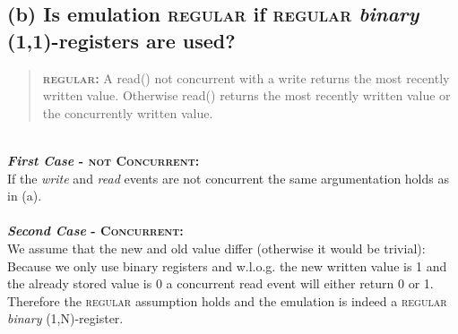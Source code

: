 \documentclass{article}
\begin{document}
\begin{adjustwidth}{2em}{2em}
		\subsection*{(b) Is emulation \textsc{regular} if \textsc{regular} \textit{binary} (1,1)-registers are used?}
		\begin{adjustwidth}{1em}{2em}
			\begin{quote}
				\textbf{\textsc{regular}:} A read() not concurrent with a write returns the most recently written value. Otherwise read() returns the most recently written value or the concurrently written value.
			\end{quote}
			\hfill \\
			\textbf{\textit{First Case} - \textsc{not Concurrent}:} \\
			If the \textit{write} and \textit{read} events are not concurrent the same argumentation holds as in (a). \\
			\\
			\textbf{\textit{Second Case} - \textsc{Concurrent}:} \\
			We assume that the new and old value differ (otherwise it would be trivial): \\
			Because we only use binary registers and w.l.o.g. the new written value is 1 and the already stored value is 0 a concurrent read event will either return 0 or 1. Therefore the \textsc{regular} assumption holds and the emulation is indeed a \textsc{regular} \textit{binary} (1,N)-register.
		\end{adjustwidth}

\end{adjustwidth}
\end{document}
